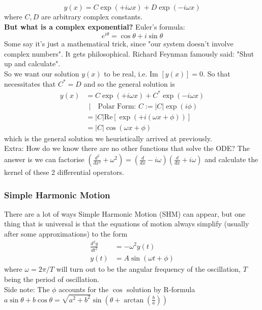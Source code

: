 \documentclass{article}
\begin{document}
$$y(x) = C \exp(+i\omega x) + D \exp(-i \omega x)$$
where $C,D$ are arbitrary complex constants.\\[10pt]
\textbf{But what is a complex exponential? } Euler's formula: 
$$e^{i\theta} = \cos \theta + i \sin \theta$$
Some say it's just a mathematical trick, since "our system doesn't involve complex numbers". It gets philosophical. Richard Feynman famously said: "Shut up and calculate". \\[10pt]
So we want our solution $y(x)$ to be real, i.e. $\text{Im }[y(x)] = 0$. So that necessitates that $C^* = D$ and so the general solution is 
\begin{align}
    y(x) &= C \exp(+i\omega x) + C^* \exp(-i\omega x)\\
    &\ \ |\quad \text{Polar Form: }C := |C| \exp(i \phi) \\
    &= |C| \text{Re}[\exp(+i (\omega x + \phi))] \\
    &= |C| \cos (\omega x + \phi)
\end{align}
which is the general solution we heuristically arrived at previously. \\[10pt]
Extra: How do we know there are no other functions that solve the ODE? The answer is we can factorise $\left(\frac{d^2}{dx^2} + \omega^2\right) = \left(\frac{d}{dx} - i\omega\right) \left(\frac{d}{dx} + i\omega\right)$ and calculate the kernel of these 2 differential operators.

\subsubsection{Simple Harmonic Motion}

There are a lot of ways Simple Harmonic Motion (SHM) can appear, but one thing that is universal is that the equations of motion always simplify (usually after some approximations) to the form 
\begin{align}
    \frac{d^2 y}{dt^2} &= -\omega^2 y(t) \\
    y(t) &= A \sin (\omega t + \phi)
\end{align}
where $\omega = 2\pi/T$ will turn out to be the angular frequency of the oscillation, $T$ being the period of oscillation. \\[10pt]
Side note: The $\phi$ accounts for the $\cos$ solution by R-formula $a \sin \theta + b \cos \theta = \sqrt{a^2 + b^2} \sin(\theta + \arctan \left(\frac{b}{a}\right))$
\end{document}
